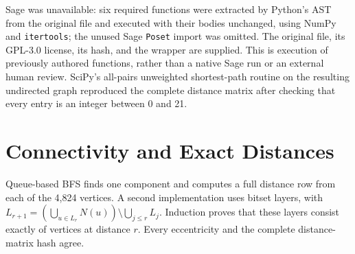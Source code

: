 \documentclass[11pt]{article}
\begin{document}
Sage was unavailable: six required functions were extracted by Python's AST
from the original file and executed with their bodies unchanged, using NumPy
and \texttt{itertools}; the unused Sage \texttt{Poset} import was omitted.
The original file, its GPL-3.0 license, its hash, and the wrapper are supplied.
This is execution of previously authored functions, rather than a native Sage
run or an external human review. SciPy's all-pairs unweighted shortest-path
routine on the resulting undirected graph reproduced the complete distance
matrix after checking that every entry is an integer between 0 and 21.

\section{Connectivity and Exact Distances}
Queue-based BFS finds one component and computes a full distance row from each
of the 4,824 vertices. A second implementation uses bitset layers, with
$L_{r+1}=(\bigcup_{u\in L_r}N(u))\setminus\bigcup_{j\leq r}L_j$.
Induction proves that these layers consist exactly of vertices at distance $r$.
Every eccentricity and the complete distance-matrix hash agree.
\end{document}
